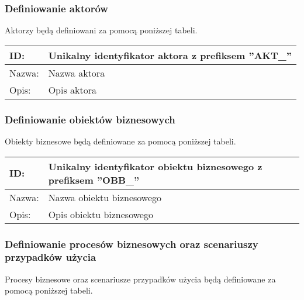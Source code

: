 \subsubsection*{Definiowanie aktorów}
Aktorzy będą definiowani za pomocą poniższej tabeli.
\begin{center}
\begin{tabular}[h]{|p{1.6cm}|p{13.5cm}|}
\hline
ID: & Unikalny identyfikator aktora z prefiksem ''AKT\_'' \\ \hline
Nazwa: & Nazwa aktora \\ \hline
Opis: & Opis aktora \\
\hline
\end{tabular}
\end{center}

\subsubsection*{Definiowanie obiektów biznesowych}
Obiekty biznesowe będą definiowane za pomocą poniższej tabeli.
\begin{center}
\begin{tabular}[h]{|p{1.6cm}|p{13.5cm}|}
\hline
ID: & Unikalny identyfikator obiektu biznesowego z prefiksem ''OBB\_'' \\ \hline
Nazwa: & Nazwa obiektu biznesowego \\ \hline
Opis: & Opis obiektu biznesowego \\
\hline
\end{tabular}
\end{center}

\subsubsection*{Definiowanie procesów biznesowych oraz scenariuszy przypadków użycia}
Procesy biznesowe oraz scenariusze przypadków użycia będą definiowane za pomocą poniższej tabeli.


